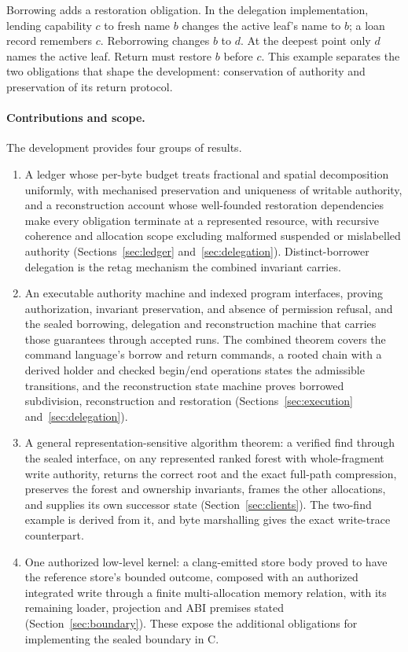 \documentclass[a4paper,UKenglish,cleveref]{lipics-v2021}
\begin{document}
Borrowing adds a restoration obligation. In the delegation implementation,
lending capability $c$ to fresh name $b$ changes the active leaf's name to $b$;
a loan record remembers $c$. Reborrowing changes $b$ to $d$. At the deepest
point only $d$ names the active leaf. Return must restore $b$ before $c$.
This example separates the two obligations that shape the development:
conservation of authority and preservation of its return protocol.

\paragraph*{Contributions and scope.}
The development provides four groups of results.
\begin{enumerate}
\item A ledger whose per-byte budget treats fractional and spatial decomposition
uniformly, with mechanised preservation and uniqueness of writable authority, and
a reconstruction account whose well-founded restoration dependencies make every
obligation terminate at a represented resource, with recursive coherence and
allocation scope excluding malformed suspended or mislabelled authority
(Sections~\ref{sec:ledger} and~\ref{sec:delegation}). Distinct-borrower
delegation is the retag mechanism the combined invariant carries.
\item An executable authority machine and indexed program interfaces, proving
authorization, invariant preservation, and absence of permission refusal, and the
sealed borrowing, delegation and reconstruction machine that carries those
guarantees through accepted runs. The combined theorem covers the command
language's borrow and return commands, a rooted chain with a derived holder and
checked begin/end operations states the admissible transitions, and the
reconstruction state machine proves borrowed subdivision, reconstruction and
restoration (Sections~\ref{sec:execution} and~\ref{sec:delegation}).
\item A general representation-sensitive algorithm theorem: a verified find
through the sealed interface, on any represented ranked forest with
whole-fragment write authority, returns the correct root and the exact
full-path compression, preserves the forest and ownership invariants, frames the
other allocations, and supplies its own successor state
(Section~\ref{sec:clients}). The two-find example is derived from it, and byte
marshalling gives the exact write-trace counterpart.
\item One authorized low-level kernel: a clang-emitted store body proved to have
the reference store's bounded outcome, composed with an authorized integrated
write through a finite multi-allocation memory relation, with its remaining
loader, projection and ABI premises stated
(Section~\ref{sec:boundary}). These expose the additional obligations for
implementing the sealed boundary in C.
\end{enumerate}
\end{document}
